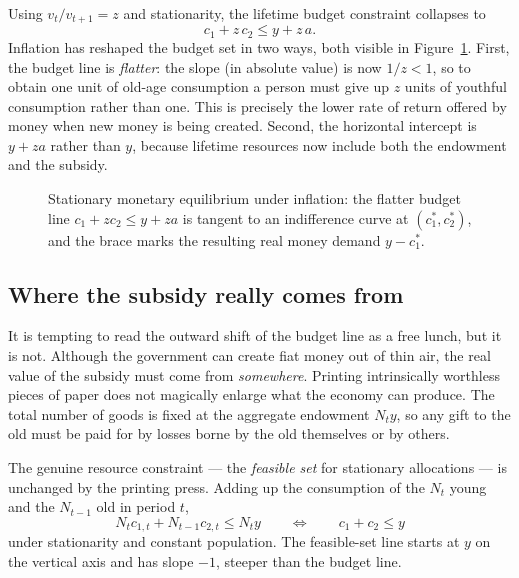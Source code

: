 
Using $v_t/v_{t+1} = z$ and stationarity, the lifetime budget constraint collapses to
\[
c_1 + z\,c_2 \le y + z\,a .
\]
Inflation has reshaped the budget set in two ways, both visible in Figure~\ref{fig:money-3}. First, the budget line is \emph{flatter}: the slope (in absolute value) is now $1/z < 1$, so to obtain one unit of old-age consumption a person must give up $z$ units of youthful consumption rather than one. This is precisely the lower rate of return offered by money when new money is being created. Second, the horizontal intercept is $y + za$ rather than $y$, because lifetime resources now include both the endowment and the subsidy.

\begin{figure}[h]
\centering

\caption{Stationary monetary equilibrium under inflation: the flatter budget line $c_1 + z c_2 \le y + za$ is tangent to an indifference curve at $(c_1^*,c_2^*)$, and the brace marks the resulting real money demand $y - c_1^*$.}
\label{fig:money-3}
\end{figure}

\subsection*{Where the subsidy really comes from}

It is tempting to read the outward shift of the budget line as a free lunch, but it is not. Although the government can create fiat money out of thin air, the real value of the subsidy must come from \emph{somewhere}. Printing intrinsically worthless pieces of paper does not magically enlarge what the economy can produce. The total number of goods is fixed at the aggregate endowment $N_t y$, so any gift to the old must be paid for by losses borne by the old themselves or by others.

The genuine resource constraint --- the \emph{feasible set} for stationary allocations --- is unchanged by the printing press. Adding up the consumption of the $N_t$ young and the $N_{t-1}$ old in period $t$,
\[
N_t c_{1,t} + N_{t-1} c_{2,t} \le N_t y
\qquad\Longleftrightarrow\qquad
c_1 + c_2 \le y
\]
under stationarity and constant population. The feasible-set line starts at $y$ on the vertical axis and has slope $-1$, steeper than the budget line.


